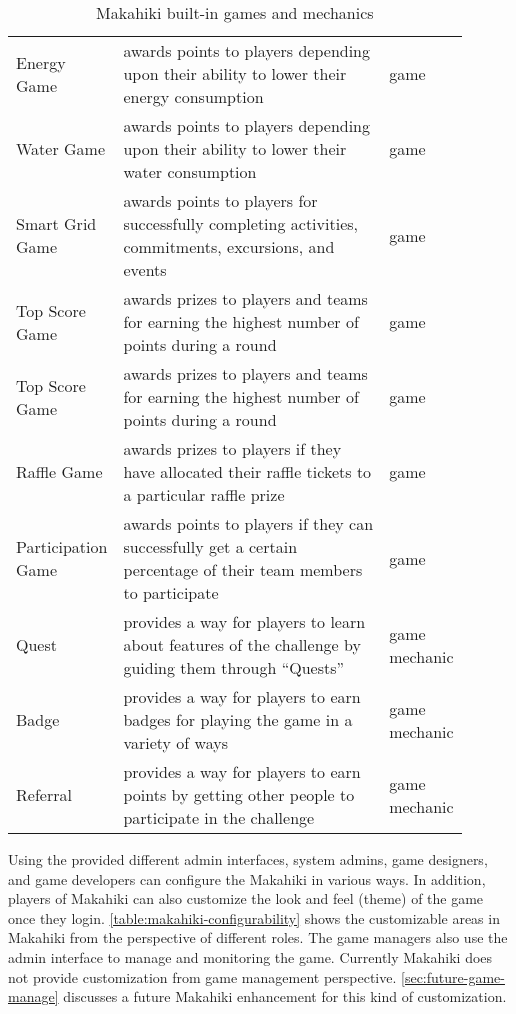 \begin{table}[ht!]
  \centering
  \begin{tabular} {|P{0.2\linewidth}|P{0.6\linewidth}|P{0.1\linewidth}|}
    \hline
     &
     &
     \\
    \hline
    Energy Game & awards points to players depending upon their ability to lower their energy consumption & game \\
    \hline
    Water Game & awards points to players depending upon their ability to lower their water consumption & game \\
    \hline
    Smart Grid Game & awards points to players for successfully completing activities, commitments, excursions, and events & game \\
    \hline
    Top Score Game & awards prizes to players and teams for earning the highest number of points during a round & game \\
    \hline
    Top Score Game & awards prizes to players and teams for earning the highest number of points during a round & game \\
    \hline
    Raffle Game & awards prizes to players if they have allocated their raffle tickets to a particular raffle prize & game \\
    \hline
    Participation Game & awards points to players if they can successfully get a certain percentage of their team members to participate & game \\
    \hline
    Quest & provides a way for players to learn about features of the challenge by guiding them through ``Quests'' & game mechanic\\
    \hline
    Badge & provides a way for players to earn badges for playing the game in a variety of ways & game mechanic\\
    \hline
    Referral & provides a way for players to earn points by getting other people to participate in the challenge & game mechanic\\
    \hline
  \end{tabular}
  \caption{Makahiki built-in games and mechanics}
  \label{table:makahiki-games}
\end{table}

Using the provided different admin interfaces, system admins, game designers, and game developers can configure the Makahiki in various ways. In addition, players of Makahiki can also customize the look and feel (theme) of the game once they login. \autoref{table:makahiki-configurability} shows the customizable areas in Makahiki from the perspective of different roles. The game managers also use the admin interface to manage and monitoring the game. Currently Makahiki does not provide customization from game management perspective. \autoref{sec:future-game-manage} discusses a future Makahiki enhancement for this kind of customization.


